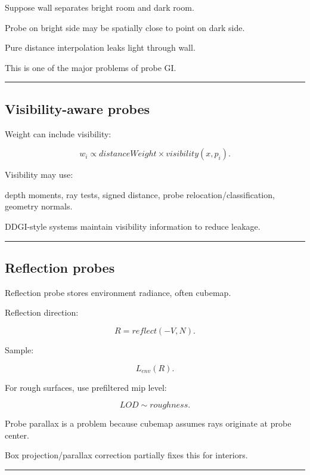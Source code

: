 Suppose wall separates bright room and dark room.

Probe on bright side may be spatially close to point on dark side.

Pure distance interpolation leaks light through wall.

This is one of the major problems of probe GI.

\begin{center}\rule{0.5\linewidth}{0.5pt}\end{center}

\subsection{Visibility-aware probes}\label{04-visual-computing-ii-ch040-visibility-aware-probes}

Weight can include visibility:

\[
w_i
\propto
distanceWeight
\times
visibility(x,p_i).
\]

Visibility may use:

depth moments, ray tests, signed distance, probe relocation/classification, geometry normals.

DDGI-style systems maintain visibility information to reduce leakage.

\begin{center}\rule{0.5\linewidth}{0.5pt}\end{center}

\subsection{Reflection probes}\label{04-visual-computing-ii-ch040-reflection-probes}

Reflection probe stores environment radiance, often cubemap.

Reflection direction:

\[
R=
reflect(-V,N).
\]

Sample:

\[
L_{env}(R).
\]

For rough surfaces, use prefiltered mip level:

\[
LOD
\sim
roughness.
\]

Probe parallax is a problem because cubemap assumes rays originate at probe center.

Box projection/parallax correction partially fixes this for interiors.

\begin{center}\rule{0.5\linewidth}{0.5pt}\end{center}

